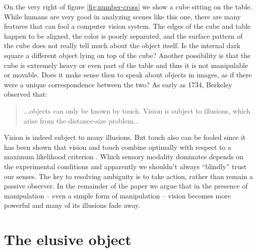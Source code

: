 %
%
On the very right of figure \ref{fig:number-cross} we show a 
cube sitting on the table. While humans are very good in analyzing
scenes like this one, there are many features that can fool
a computer vision system. The edges of the cube and table 
happen to be aligned, the color is poorly separated, and the surface
pattern of the cube does not really tell much about the object
itself. Is the internal dark square a different object lying on 
top of the cube? Another possibility is that the cube is extremely
heavy or even part of the table and thus it is not manipulable or
movable. Does it make sense then to speak about objects in images,
as if there were a unique correspondence between the two?
As early as 1734, Berkeley observed that:
%
\begin{quote}
...objects can only be known by
touch. Vision is subject to illusions, which arise from the
distance-size problem... \cite{berkeley72new}
\end{quote}
%
Vision is indeed subject to many illusions.  But touch also can be
fooled since it has been shown that vision and touch combine 
optimally with respect to a maximum likelihood criterion 
\cite{ernst-banks-2002}. Which sensory modality dominates 
depends on the experimental conditions and apparently we 
shouldn't always ``blindly'' trust our senses.
The key to resolving ambiguity is to take action, rather than remain
a passive observer.
In the remainder of the paper we argue that in the presence of
manipulation -- even a simple form of manipulation -- vision 
becomes more powerful and many of its illusions fade away.



\ifverbose 

\section{The elusive object}

\label{sect:introduction}


